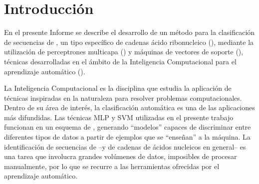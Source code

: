 %
%
%
\chapter{Introducción}
\setcounter{page}{1}
%
En el presente Informe se describe el desarrollo de un método para la
clasificación de secuencias de \premirna{}, un tipo específico de
cadenas ácido ribonucleico (), mediante la utilización de
perceptrones multicapa () y máquinas de vectores de soporte
(), técnicas desarrolladas en el ámbito de la Inteligencia
Computacional para el aprendizaje automático ().

La Inteligencia Computacional es la disciplina que estudia la
aplicación de técnicas inspiradas en la naturaleza para resolver
problemas computacionales.
Dentro de su área de interés, la clasificación automática es una de
las aplicaciones más difundidas.
Las técnicas MLP y SVM utilizadas en el presente trabajo funcionan en
un esquema de , generando ``modelos''
capaces de discriminar entre diferentes tipos de datos a partir de
ejemplos que se ``enseñan'' a la máquina.
La identificación de secuencias de  --y de cadenas de
ácidos nucleicos en general-- es una tarea que involucra grandes
volúmenes de datos, imposibles de procesar manualmente, por lo que se
recurre a las herramientas ofrecidas por el aprendizaje automático.
